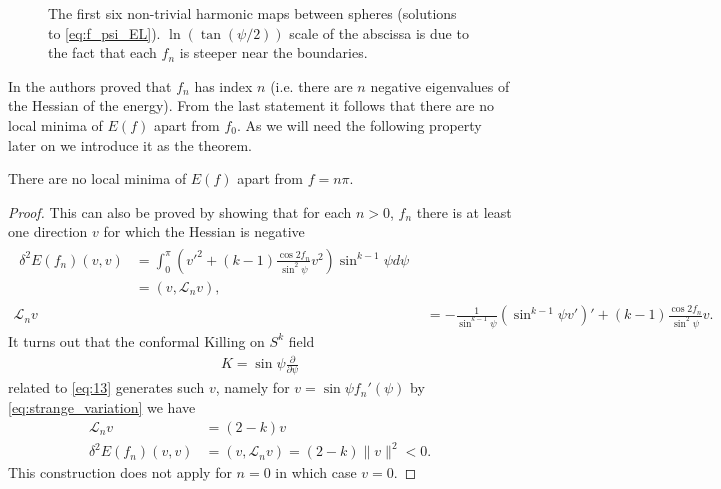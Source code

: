 \begin{figure}[ht]
  \centering
  
  \caption{The first six non-trivial harmonic maps between spheres
    (solutions to \eqref{eq:f_psi_EL}). $\ln(\tan(\psi/2))$ scale of
    the abscissa is due to the fact that each $f_n$ is steeper near
    the boundaries.}
  \label{fig:Harmonic_maps}
\end{figure}

In \cite{Corlette2001} the authors proved that $f_n$ has index $n$
(i.e. there are $n$ negative eigenvalues of the Hessian of the
energy). From the last statement it follows that there are no local
minima of $E(f)$ apart from $f_0$. As we will need the following
property later on we introduce it as the theorem.
\begin{theorem}
  \label{thm:harmonic-map-index}
  There are no local minima of $E(f)$ apart from $f=n\pi$.
\end{theorem}
\begin{proof}
  This can also be proved by showing that for each $n>0$, $f_n$ there
  is at least one direction $v$ for which the Hessian is negative
  \begin{align}\label{eq:30}
    \begin{split}
      \delta^2E(f_n)(v,v) &=\int_0^{\pi} \left(
        v'^2+(k-1)\frac{\cos2f_n}{\sin^2\psi}v^2 \right)\sin^{k-1}\psi
      d\psi\\
      &=(v,\mathcal{L}_n v),
    \end{split}\\
    \mathcal{L}_nv&=-\frac{1}{\sin^{k-1}\psi}\left(\sin^{k-1}\psi
      v'\right)'+(k-1)\frac{\cos2f_n}{\sin^2\psi}v.
  \end{align}
  It turns out that the conformal Killing on $S^k$
  field
  \begin{align}
    \label{eq:31}
    K=\sin\psi\frac{\partial}{\partial\psi}
  \end{align}
  related to \eqref{eq:13} generates such $v$, namely for $v=\sin\psi
  f_n'(\psi)$ by \eqref{eq:strange_variation} we have
  \begin{align}
    \label{eq:32}
    \mathcal{L}_n v&=(2-k)v\\
    \delta^2 E(f_n)(v,v)&=(v,\mathcal{L}_n v)=(2-k)\lVert v\rVert^2<0.
  \end{align}
  This construction does not apply for $n=0$ in which case $v=0$.
\end{proof}

